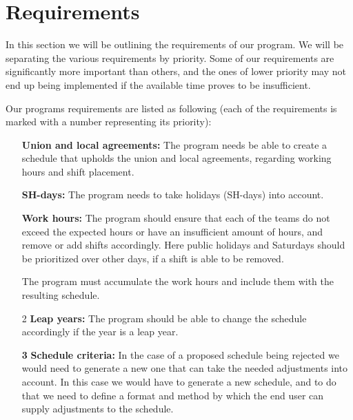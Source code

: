 \section{Requirements}
In this section we will be outlining the requirements of our program. We will be separating the various requirements by priority. Some of our requirements are significantly more important than others, and the ones of lower priority may not end up being implemented if the available time proves to be insufficient.

Our programs requirements are listed as following (each of the requirements is marked with a number representing its priority):
\begin{itemize}
    
    \item[] \textbf{Union and local agreements:} The program needs be able to create a schedule that upholds the union and local agreements, regarding working hours and shift placement.
    
    \item[] \textbf{SH-days:} The program needs to take holidays (SH-days) into account.
    
    \item[] \textbf{Work hours:} The program should ensure that each of the teams do not exceed the expected hours or have an insufficient amount of hours, and remove or add shifts accordingly. Here public holidays and Saturdays should be prioritized over other days, if a shift is able to be removed.
    
    The program must accumulate the work hours and include them with the resulting schedule.
    
    
    \item[2] \textbf{Leap years:} The program should be able to change the schedule accordingly if the year is a leap year.
    
    \item[\textbf{3}] \textbf{Schedule criteria:} In the case of a proposed schedule being rejected we would need to generate a new one that can take the needed adjustments into account. In this case we would have to generate a new schedule, and to do that we need to define a format and method by which the end user can supply adjustments to the schedule.
    

\end{itemize}
